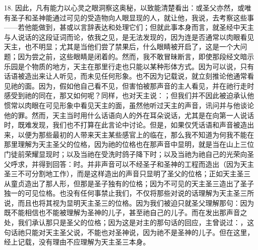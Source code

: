 18. 因此，凡有能力以心灵之眼洞察这奥秘，以致能清楚看出：或圣父亦然，或唯有圣子和圣神能通过可见的受造物向人眼显现的人，就让他，我说，去考察这些事——若他能做到，甚或以言辞表达和处理它们；但就此事本身而言，就圣经中天主与人说话的这段证词而论，依我之见，是无法发现的，因为连是否通常以肉眼看见天主，也不明显；尤其是当他们尝了禁果后，什么眼睛被开启了，这是一个大问题；因为尝之前，这些眼睛是闭着的。然而，我不敢冒昧断言，即使那段经文暗示乐园是个物质的地方，天主在那里行走也只能以某种形体方式。因为可以说，只有话语被造出来让人听见，而未见任何形象。也不因为记载说，就立刻推论他通常看见祂的面。因为，假如他自己看不见，但害怕被那声音的主人看见，并在祂行走时感受到祂的同在，那又如何呢？同样，也对天主说：；但我们并不因此被迫承认他惯常以肉眼在可见形象中看见天主的面，虽然他听过天主的声音，讯问并与他谈论他的罪。然而，天主当时用什么话语向人的外在耳朵说话，尤其是在向第一人说话时，既难发现，我们也不打算在此言论中讨论。但是，如果仅凭话语和声音被造出来，以便为那些最初的人带来天主某些感官上的临在，那么我不知道为何我不能在那里理解为天主圣父的位格，因为祂的位格也在那声音中显明，就是当在山上三位门徒前荣耀显现时；以及当祂在受洗时鸽子降下时；以及当祂为祂自己的光荣向圣父呼求，并得到回答：时。并非声音可以不经圣子和圣神的工程而造出（因为天主圣三不可分割地工作），而是这样造出的声音只显明了圣父的位格；正如天主圣三从童贞造出了那人形，但那是圣子独有的位格；因为不可见的天主圣三造出了圣子独一的可见位格。也没有任何事禁止我们，不仅将那些对说的话理解为天主圣三所说，而且也将其视为显明天主圣三的位格。因为我们被迫只就圣父理解那句：因为既不能相信也不能被理解为圣神的儿子，甚至祂自己的儿子。而在发出那声音之处，我们承认那只是圣父的位格；因为这是对主的那句话的回应，主曾说过：，这句话祂只能对天主圣父说，不能也对圣神说，因为祂不是圣神的儿子。但在这里，经上记载，没有理由不应理解为天主圣三本身。\par

